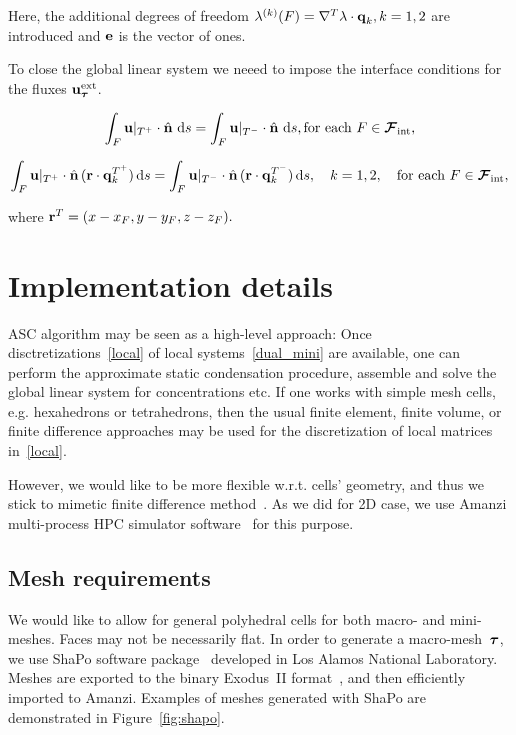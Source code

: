 Here, the additional degrees of freedom $\lambda^{(k)}(F) = \nabla^T \lambda  \cdot  \vect q_k, k=1,2$
are introduced and $\vect e$ is the vector of ones.

To close the global linear system we neeed to impose the interface conditions for the fluxes $\vect u^{\text{ext}}_\mmesh$.

\begin{equation}\label{flux_cont1}
\int_F \vect u|_{\bcell^+}\cdot\hat{\vect n}\, \diff s =
\int_F \vect u|_{\bcell^-}\cdot\hat{\vect n}\, \diff s, \text{for each } F \in \bfaces[int],
\end{equation}


\begin{equation}\label{flux_cont2}
\int_F \vect u|_{\bcell^+}\cdot\hat{\vect n}\,({\vect r} \cdot \vect q_k^{\bcell^+}) \diff s =
\int_F \vect u|_{\bcell^-}\cdot\hat{\vect n}\,({\vect r} \cdot \vect q_k^{\bcell^-}) \diff s,
\quad k=1,2,  \quad \text{for each } F \in \bfaces[int],
\end{equation}

where ${\vect r}^T = (x-x_F, y-y_F, z-z_F).$

\section{Implementation details}

ASC algorithm may be seen as a high-level approach: Once disctretizations~\eqref{local} of local systems~\eqref{dual_mini} are available, one can perform the approximate static condensation procedure, assemble and solve the global linear system for concentrations etc. If one works with simple mesh cells, e.g. hexahedrons or tetrahedrons, then the usual finite element, finite volume, or finite difference approaches may be used for the discretization of local matrices in~\eqref{local}. 

However, we would like to be more flexible w.r.t. cells' geometry, and thus we stick to mimetic finite difference method~\cite{MFDbook}. As we did for 2D case, we use Amanzi multi-process HPC simulator software~\cite{amanzi} for this purpose.

\subsection{Mesh requirements}

We would like to allow for general polyhedral cells for both macro- and mini-meshes. Faces may not be necessarily flat. In order to generate a macro-mesh~$\mmesh$, we use ShaPo software package~\cite{shapo2d, shapo3d} developed in Los Alamos National Laboratory. Meshes are exported to the binary Exodus~II format~\cite{exo}, and then efficiently imported to Amanzi. Examples of meshes generated with ShaPo are demonstrated in Figure~\ref{fig:shapo}.

